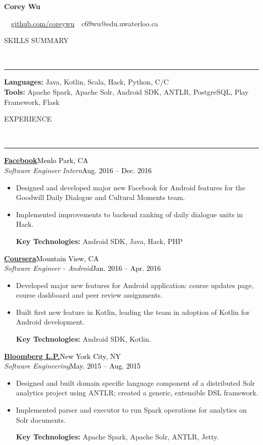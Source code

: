 \documentclass[11pt, letterpaper, oneside]{article}
\makeatletter
\newcommand{\name}{Corey Wu}
\newcommand{\github}{\href{https://github.com/coreywu}{github.com/coreywu}}
\newcommand{\email}{c69wu@edu.uwaterloo.ca}
\newcommand{\HRule}[2]{\textcolor{#1}{\rule{\linewidth}{#2}}}
\newcommand{\sectiontitle}[1]{\begin{minipage}{\textwidth}\vspace{-7.5pt}\begin{flushleft}\hspace{-20.5pt}\vspace{-25pt}
\Large\MakeUppercase{#1}\end{flushleft}\end{minipage}\\\HRule{black}{0.15mm}\vspace{\baselineskip}}
\newenvironment{ressection}[1]{
  \sectiontitle{#1}}
  {\vspace{-\baselineskip}}
\newcommand{\resentryheader}[4]{
    \vspace{-6pt}
    \textbf{#1}\hspace{\stretch{1}}\textcolor{black}{#3}\\
    \textit{#2}\hspace{\stretch{1}}\textcolor{black}{#4}\\
}
\newcommand{\resitem}[1]{
    \vspace{2pt}
    \item \begin{flushleft} #1 \end{flushleft}
}
\newcommand{\CPP}
{C\nolinebreak[4]\hspace{-.05em}\raisebox{.22ex}{\footnotesize\bf ++}}
\newenvironment{resentry}[4]{
  \begin{minipage}{\textwidth}
  \vspace{-3pt}
    \resentryheader{#1}{#2}{#3}{#4}
        \vspace{-\baselineskip}
    \begin{itemize}[noitemsep,nolistsep]
}{
    \end{itemize}
        \vspace{\baselineskip}
        \end{minipage}
}
\makeatother
\begin{document}
\begin{center}

	{\Huge \textbf{\name}}

	\ \ \github \ \textbullet \ \email \ \
\end{center}

\vspace{-6pt}

\begin{ressection}{Skills Summary}\vspace{-12pt}
  \hspace{-20pt} \textbf{Languages:} Java, Kotlin, Scala, Hack, Python, C/\CPP \\
  \hspace{-20pt} \textbf{Tools:} Apache Spark, Apache Solr, Android SDK, ANTLR,  PostgreSQL, Play Framework, Flask
\end{ressection}

\vspace{20pt}

\begin{ressection}{Experience}
  \begin{resentry}{\href{https://www.facebook.com/Engineering/}{Facebook}}{Software Engineer Intern}{Menlo Park, CA}{Aug. 2016 -- Dec. 2016}
   \resitem{Designed and developed major new Facebook for Android features for the Goodwill Daily Dialogue and Cultural Moments team. }
    \resitem{Implemented improvements to backend ranking of daily dialogue units in Hack.}
    \vspace{3pt}  \hspace{-15pt}
    \textbf{Key Technologies:} Android SDK, Java, Hack, PHP
	\vspace{6pt}   
  \end{resentry}  
 \begin{resentry}{\href{https://www.coursera.org/}{Coursera}}{Software Engineer - Android}{Mountain View, CA}{Jan. 2016 -- Apr. 2016}
    \resitem{Developed major new features for Android application: course updates page, course dashboard and peer review assignments.}
    \resitem{Built first new feature in Kotlin, leading the team in adoption of Kotlin for Android development.}
    \vspace{3pt} \hspace{-15pt}
    \textbf{Key Technologies:} Android SDK, Kotlin.
    \vspace{6pt} 
  \end{resentry}  
  \begin{resentry}{\href{http://www.bloomberg.com/professional/}{Bloomberg L.P.}}{Software Engineering}{New York City, NY}{May. 2015 -- Aug. 2015}
    \resitem{Designed and built domain specific language component of a distributed Solr analytics project using ANTLR; created a generic, extensible DSL framework.}
    \resitem{Implemented parser and executor to run Spark operations for analytics on Solr documents.}
    \vspace{3pt} \hspace{-15pt}
    \textbf{Key Technologies:} Apache Spark, Apache Solr, ANTLR, Jetty.
    \vspace{6pt} 
  \end{resentry}  
\end{ressection}
\end{document}
